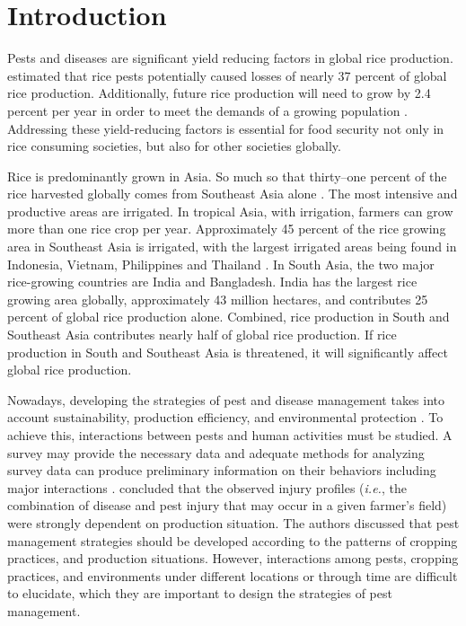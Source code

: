 \section{Introduction}

Pests and diseases are significant yield reducing factors in global rice production. \citet{Oerke_2005_Crop} estimated that rice pests potentially caused losses of nearly 37 percent of global rice production. Additionally, future rice production will need to grow by 2.4 percent per year in order to meet the demands of a growing population \cite{Ray_2013_Yield}. Addressing these yield-reducing factors is essential for food security not only in rice consuming societies, but also for other societies globally.

Rice is predominantly grown in Asia. So much so that thirty--one percent of the rice harvested globally comes from Southeast Asia alone \citep{OECD_2012_Agricultural}. The most intensive and productive areas are irrigated. In tropical Asia, with irrigation, farmers can grow more than one rice crop per year. Approximately 45 percent of the rice growing area in Southeast Asia is irrigated, with the largest irrigated areas being found in Indonesia, Vietnam, Philippines and Thailand \citep{Mutert_2002_Developments}. In South Asia, the two major rice-growing countries are India and Bangladesh. India has the largest rice growing area globally, approximately 43 million hectares, and contributes 25 percent of global rice production alone. Combined, rice production in South and Southeast Asia contributes nearly half of global rice production. If rice production in South and Southeast Asia is threatened, it will significantly affect global rice production.  

Nowadays, developing the strategies of pest and disease management takes into account sustainability, production efficiency, and environmental protection \citep{Mew_2004_Looking}. To achieve this, interactions between pests and human activities must be studied. A survey may provide the necessary data and adequate methods for analyzing survey data can produce preliminary information on their behaviors including major interactions \citep{Savary_1995_Use}. \citet{Savary_2000_Characterization} concluded that the observed injury profiles (\textit{i.e.}, the combination of disease and pest injury that may occur in a given farmer's field) were strongly dependent on production situation.  The authors discussed that pest management strategies should be developed according to the patterns of cropping practices, and production situations. However, interactions among pests, cropping practices, and environments under different locations or through time are difficult to elucidate, which they are important to design the strategies of pest management.

